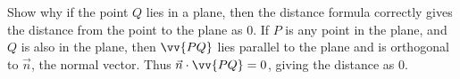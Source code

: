 {Show why if the point $Q$ lies in a plane, then the distance formula correctly gives the distance from the point to the plane as $0$.
}
{If $P$ is any point in the plane, and $Q$ is also in the plane, then $\vv{PQ}$ lies parallel to the plane and is orthogonal to $\vec n$, the normal vector. Thus $\vec n\cdot \vv{PQ}=0$, giving the distance as 0.
}

